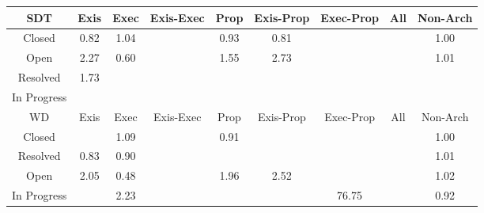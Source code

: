 \begin{tabular}{|c||c|c|c|c|c|c|c|c|}
\hline
\hline
SDT & Exis & Exec & Exis-Exec & Prop & Exis-Prop & Exec-Prop & All & Non-Arch \\ 
\hline
Closed & \cellcolor[rgb]{0.8744208201203808,0.6715918819031358,0.38679276544568875} 0.82 & \cellcolor[rgb]{0.9098218501243441,0.8399156132167945,0.42} 1.04 &  & \cellcolor[rgb]{0.8969273221710701,0.7781226582763981,0.407798834026332} 0.93 & \cellcolor[rgb]{0.8724348071229002,0.662191420381727,0.38493915331470674} 0.81 &  &  & \cellcolor[rgb]{0.9098938640598264,0.8394976232165116,0.4199009397891713} 1.00 \\ 
\hline
Open & \cellcolor[rgb]{0.9036234645984674,0.8369795358624319,0.42} 2.27 & \cellcolor[rgb]{0.8333601549574662,0.47723806679867303,0.3484694779603017} 0.60 &  & \cellcolor[rgb]{0.9072206108734249,0.8386834472558328,0.42} 1.55 & \cellcolor[rgb]{0.9013086748297268,0.8358830564982916,0.42} 2.73 &  &  & \cellcolor[rgb]{0.9099581839228199,0.8399801923844936,0.42} 1.01 \\ 
\hline
Resolved & \cellcolor[rgb]{0.9063239042869906,0.8382586915043639,0.42} 1.73 &  &  &  &  &  &  &  \\ 
\hline
In Progress &  &  &  &  &  &  &  &  \\ 
\hline
\hline
WD & Exis & Exec & Exis-Exec & Prop & Exis-Prop & Exec-Prop & All & Non-Arch \\ 
\hline
Closed &  & \cellcolor[rgb]{0.9095478593985069,0.8397858281361348,0.42} 1.09 &  & \cellcolor[rgb]{0.8925377353153652,0.7573452804927284,0.4037018862943408} 0.91 &  &  &  & \cellcolor[rgb]{0.909150270261933,0.8359779459064827,0.41920691891113737} 1.00 \\ 
\hline
Resolved & \cellcolor[rgb]{0.8764670579851072,0.6812774077961735,0.3887025874527666} 0.83 & \cellcolor[rgb]{0.890695731364951,0.7486264617941008,0.4019826826072875} 0.90 &  &  &  &  &  & \cellcolor[rgb]{0.9099678986224594,0.8399847940843227,0.42} 1.01 \\ 
\hline
Open & \cellcolor[rgb]{0.9047115262477069,0.8374949334857558,0.42} 2.05 & \cellcolor[rgb]{0.808517968937189,0.3596517196360278,0.32528343767470974} 0.48 &  & \cellcolor[rgb]{0.9052071012184121,0.8377296795245109,0.42} 1.96 & \cellcolor[rgb]{0.9023675180077848,0.8363846137931612,0.42} 2.52 &  &  & \cellcolor[rgb]{0.9098964082866446,0.8399509302410422,0.42} 1.02 \\ 
\hline
In Progress &  & \cellcolor[rgb]{0.9038118480687046,0.8370687701378074,0.42} 2.23 &  &  &  & \cellcolor[rgb]{0.53,0.66,0.42} 76.75 &  & \cellcolor[rgb]{0.8942515488991463,0.765457331455959,0.4053014456392032} 0.92 \\ 
\hline
\end{tabular}